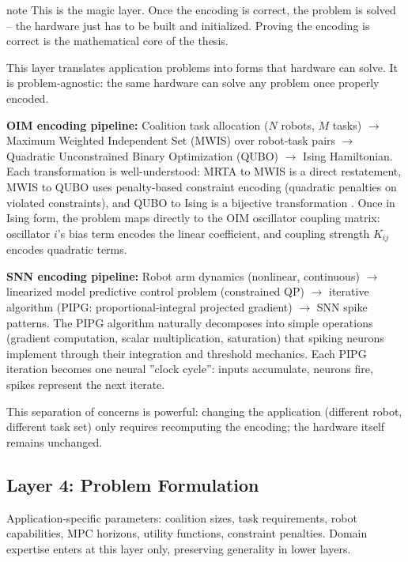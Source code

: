 \begin{block}{note}
This is the magic layer. Once the encoding is correct, the problem is solved -- the hardware just has to be built and initialized. Proving the encoding is correct is the mathematical core of the thesis.
\end{block}

This layer translates application problems into forms that hardware can solve. It is problem-agnostic: the same hardware can solve any problem once properly encoded.

\textbf{OIM encoding pipeline:} Coalition task allocation ($N$ robots, $M$ tasks) $\to$ Maximum Weighted Independent Set (MWIS) over robot-task pairs $\to$ Quadratic Unconstrained Binary Optimization (QUBO) $\to$ Ising Hamiltonian. Each transformation is well-understood: MRTA to MWIS is a direct restatement, MWIS to QUBO uses penalty-based constraint encoding (quadratic penalties on violated constraints), and QUBO to Ising is a bijective transformation \cite{Kochenberger2014, Lucas2014}. Once in Ising form, the problem maps directly to the OIM oscillator coupling matrix: oscillator $i$'s bias term encodes the linear coefficient, and coupling strength $K_{ij}$ encodes quadratic terms.

\textbf{SNN encoding pipeline:} Robot arm dynamics (nonlinear, continuous) $\to$ linearized model predictive control problem (constrained QP) $\to$ iterative algorithm (PIPG: proportional-integral projected gradient) $\to$ SNN spike patterns. The PIPG algorithm naturally decomposes into simple operations (gradient computation, scalar multiplication, saturation) that spiking neurons implement through their integration and threshold mechanics. Each PIPG iteration becomes one neural ''clock cycle'': inputs accumulate, neurons fire, spikes represent the next iterate.

This separation of concerns is powerful: changing the application (different robot, different task set) only requires recomputing the encoding; the hardware itself remains unchanged.

\subsection{Layer 4: Problem Formulation}

Application-specific parameters: coalition sizes, task requirements, robot capabilities, MPC horizons, utility functions, constraint penalties. Domain expertise enters at this layer only, preserving generality in lower layers.

